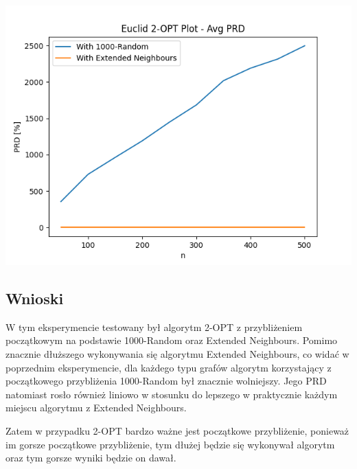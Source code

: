 \documentclass{article}
\begin{document}
\begin{center}
\includegraphics[width=\textwidth, 
                   height = 0.4\textheight, 
                   keepaspectratio]
                  {two_opt_euclid_avg_prd} 
\end{center}
                  
\subsection{Wnioski}

W tym eksperymencie testowany był algorytm 2-OPT z przybliżeniem początkowym na podstawie 1000-Random oraz Extended Neighbours. Pomimo znacznie dłuższego wykonywania się algorytmu Extended Neighbours, co widać w poprzednim eksperymencie, dla każdego typu grafów algorytm korzystający z początkowego przybliżenia 1000-Random był znacznie wolniejszy. Jego PRD natomiast rosło również liniowo w stosunku do lepszego w praktycznie każdym miejscu algorytmu z Extended Neighbours.

Zatem w przypadku 2-OPT bardzo ważne jest początkowe przybliżenie, ponieważ im gorsze początkowe przybliżenie, tym dłużej będzie się wykonywał algorytm oraz tym gorsze wyniki będzie on dawał.
\end{document}
